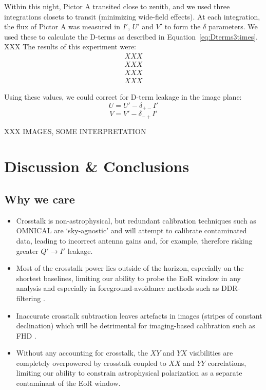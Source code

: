 \documentclass[10pt,a4paper,notitlepage]{article}
\begin{document}
Within this night, Pictor A transited close to zenith, and we used three integrations closets to transit (minimizing wide-field effects). At each integration, the flux of Pictor A was measured in $I'$, $U'$ and $V'$ to form the $\delta$ parameters. We used these to calculate the D-terms as described in Equation~\ref{eq:Dterms3times}.\\  

XXX The results of this experiment were:\\
\begin{align*}
XXX\\
XXX\\
XXX\\
XXX
\end{align*}

Using these values, we could correct for D-term leakage in the image plane:
\begin{equation}
U = U' - \delta_{+-}I'
\end{equation}
\begin{equation}
V = V' - \delta_{-+}I'
\end{equation}


XXX IMAGES, SOME INTERPRETATION 

\section{Discussion \& Conclusions}
\label{sec:conc}

\subsection{Why we care}
\begin{itemize}
\item Crosstalk is non-astrophysical, but redundant calibration techniques such as OMNICAL \cite{Zheng} are `sky-agnostic' and will attempt to calibrate contaminated data, leading to incorrect antenna gains and, for example, therefore risking greater $Q' \rightarrow I'$ leakage.
\item Most of the crosstalk power lies outside of the horizon, especially on the shortest baselines, limiting our ability to probe the EoR window in any analysis and especially in foreground-avoidance methods such as DDR-filtering \cite{Parsons}.
\item Inaccurate crosstalk subtraction leaves artefacts in images (stripes of constant declination) which will be detrimental for imaging-based calibration such as FHD \cite{Sullivan}.
\item Without any accounting for crosstalk, the $XY$ and $YX$ visibilities are completely overpowered by crosstalk coupled to $XX$ and $YY$ correlations, limiting our ability to constrain astrophysical polarization as a separate contaminant of the EoR window.
\end{itemize}
\end{document}
